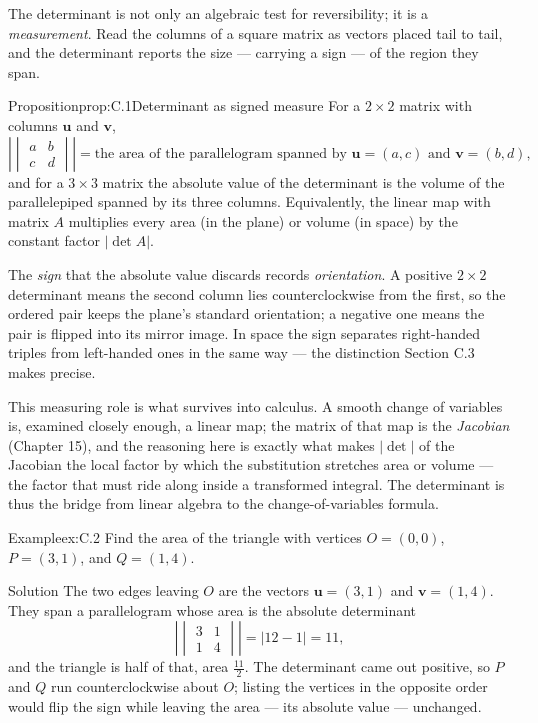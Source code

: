 \documentclass[a4paper,12pt,oneside]{memoir}
\begin{document}
The determinant is not only an algebraic test for reversibility; it is a \emph{measurement}. Read the columns of a square matrix as vectors placed tail to tail, and the determinant reports the size — carrying a sign — of the region they span.

\begin{envproposition}{Proposition}{prop:C.1}{Determinant as signed measure}
For a \(2\times 2\) matrix with columns \(\mathbf{u}\) and \(\mathbf{v}\), \[ \left|\begin{vmatrix} a & b \\ c & d \end{vmatrix}\right| = \text{the area of the parallelogram spanned by } \mathbf{u} = (a, c) \text{ and } \mathbf{v} = (b, d), \] and for a \(3\times 3\) matrix the absolute value of the determinant is the volume of the parallelepiped spanned by its three columns. Equivalently, the linear map with matrix \(A\) multiplies every area (in the plane) or volume (in space) by the constant factor \(\lvert\det A\rvert\).
\end{envproposition}
The \emph{sign} that the absolute value discards records \emph{orientation}. A positive \(2\times 2\) determinant means the second column lies counterclockwise from the first, so the ordered pair keeps the plane’s standard orientation; a negative one means the pair is flipped into its mirror image. In space the sign separates right-handed triples from left-handed ones in the same way — the distinction Section C.3 makes precise.

This measuring role is what survives into calculus. A smooth change of variables is, examined closely enough, a linear map; the matrix of that map is the \emph{Jacobian} (Chapter 15), and the reasoning here is exactly what makes \(\lvert\det\rvert\) of the Jacobian the local factor by which the substitution stretches area or volume — the factor that must ride along inside a transformed integral. The determinant is thus the bridge from linear algebra to the change-of-variables formula.

\begin{workedexample}
\begin{envexample}{Example}{ex:C.2}{}
Find the area of the triangle with vertices \(O = (0, 0)\), \(P = (3, 1)\), and \(Q = (1, 4)\).
\end{envexample}
\begin{envsolution}{Solution}{}{}
The two edges leaving \(O\) are the vectors \(\mathbf{u} = (3, 1)\) and \(\mathbf{v} = (1, 4)\). They span a parallelogram whose area is the absolute determinant \[ \left|\begin{vmatrix} 3 & 1 \\ 1 & 4 \end{vmatrix}\right| = |12 - 1| = 11, \] and the triangle is half of that, area \(\tfrac{11}{2}\). The determinant came out positive, so \(P\) and \(Q\) run counterclockwise about \(O\); listing the vertices in the opposite order would flip the sign while leaving the area — its absolute value — unchanged.
\end{envsolution}
\end{workedexample}
\end{document}
